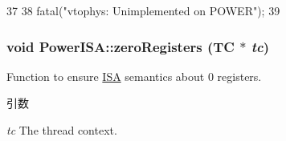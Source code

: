 \begin{DoxyCode}
37 {
38     fatal("vtophys: Unimplemented on POWER\n");
39 }
\end{DoxyCode}
\hypertarget{namespacePowerISA_a5aec2a8ae4e23cd090f22e7047c4598e}{
\subsubsection[{zeroRegisters}]{\setlength{\rightskip}{0pt plus 5cm}void PowerISA::zeroRegisters (TC $\ast$ {\em tc})}}
\label{namespacePowerISA_a5aec2a8ae4e23cd090f22e7047c4598e}
Function to ensure \hyperlink{classPowerISA_1_1ISA}{ISA} semantics about 0 registers. 
\begin{DoxyParams}{引数}
\item[{\em tc}]The thread context. \end{DoxyParams}


